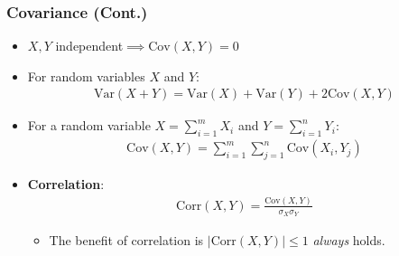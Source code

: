 \documentclass{beamer}
\begin{document}
\begin{frame}
    \frametitle{Covariance (Cont.)}
    \begin{itemize}
        \item $X,Y$ independent$\implies\text{Cov}(X,Y)=0$
        \item For random variables $X$ and $Y$:
        \begin{gather*}
            \text{Var}(X+Y)=\text{Var}(X)+\text{Var}(Y)+2\text{Cov}(X,Y)
        \end{gather*}
        \item For a random variable $X=\sum_{i=1}^mX_i$ and $Y=\sum_{i=1}^nY_i$:
        \begin{gather*}
            \text{Cov}(X,Y)=\sum_{i=1}^m\sum_{j=1}^n\text{Cov}(X_i,Y_j)
        \end{gather*}
        \item {\bf Correlation}:
        \begin{gather*}
            \text{Corr}(X,Y)=\frac{\text{Cov}(X,Y)}{\sigma_X\sigma_Y}
        \end{gather*}
        \begin{itemize}
            \item The benefit of correlation is $|\text{Corr}(X,Y)|\leq 1$ {\it always} holds.
        \end{itemize}
    \end{itemize}
\end{frame}
\end{document}
